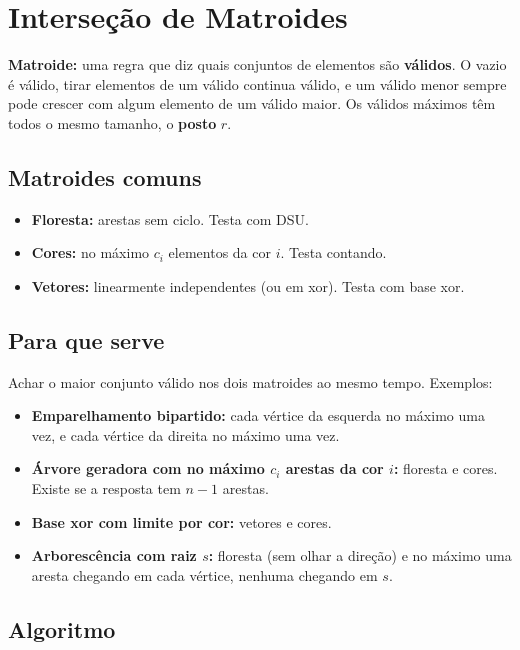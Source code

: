 \section{Interseção de Matroides}

\textbf{Matroide:} uma regra que diz quais conjuntos de elementos são \textbf{válidos}. O vazio é válido, tirar
elementos de um válido continua válido, e um válido menor sempre pode crescer com algum elemento de um válido
maior. Os válidos máximos têm todos o mesmo tamanho, o \textbf{posto} $r$.

\subsection*{Matroides comuns}

\begin{itemize}
  \item \textbf{Floresta:} arestas sem ciclo. Testa com DSU.
  \item \textbf{Cores:} no máximo $c_i$ elementos da cor $i$. Testa contando.
  \item \textbf{Vetores:} linearmente independentes (ou em xor). Testa com base xor.
\end{itemize}

\subsection*{Para que serve}

Achar o maior conjunto válido nos dois matroides ao mesmo tempo. Exemplos:
\begin{itemize}
  \item \textbf{Emparelhamento bipartido:} cada vértice da esquerda no máximo uma vez, e cada vértice da direita
        no máximo uma vez.
  \item \textbf{Árvore geradora com no máximo $c_i$ arestas da cor $i$:} floresta e cores. Existe se a resposta tem
        $n - 1$ arestas.
  \item \textbf{Base xor com limite por cor:} vetores e cores.
  \item \textbf{Arborescência com raiz $s$:} floresta (sem olhar a direção) e no máximo uma aresta chegando em cada
        vértice, nenhuma chegando em $s$.
\end{itemize}

\subsection*{Algoritmo}

